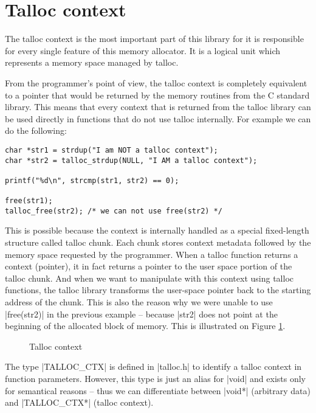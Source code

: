 \section{Talloc context}
\label{talloc:sec:context}

The talloc context is the most important part of this library for it is
responsible for every single feature of this memory allocator. It is a logical
unit which represents a memory space managed by talloc.

From the programmer's point of view, the talloc context is completely
equivalent to a pointer that would be returned by the memory routines from the
C standard library. This means that every context that is returned from the
talloc library can be used directly in functions that do not use talloc
internally. For example we can do the following:

\begin{lstlisting}
char *str1 = strdup("I am NOT a talloc context");
char *str2 = talloc_strdup(NULL, "I AM a talloc context");

printf("%d\n", strcmp(str1, str2) == 0);

free(str1);
talloc_free(str2); /* we can not use free(str2) */
\end{lstlisting}
\noindent
This is possible because the context is internally handled as a special
fixed-length structure called talloc chunk. Each chunk stores context metadata
followed by the memory space requested by the programmer. When a talloc
function returns a context (pointer), it in fact returns a pointer to the user
space portion of the talloc chunk. And when we want to manipulate with this
context using talloc functions, the talloc library transforms the user-space
pointer back to the starting address of the chunk. This is also the reason why
we were unable to use |free(str2)| in the previous example -- because |str2|
does not point at the beginning of the allocated block of memory. This is
illustrated on Figure \ref{fig:talloc-context}.

\begin{figure}[H]
  \centering
  
  \caption{Talloc context}
  \label{fig:talloc-context}
\end{figure}

\noindent
The type |TALLOC_CTX| is defined in |talloc.h| to identify a talloc context in
function parameters. However, this type is just an alias for |void| and exists
only for semantical reasons -- thus we can differentiate between |void*|
(arbitrary data) and |TALLOC_CTX*| (talloc context).

